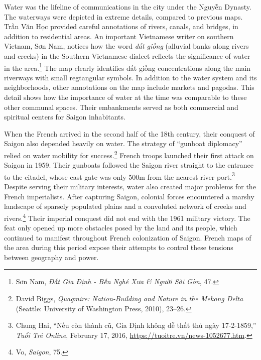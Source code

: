 Water was the lifeline of communications in the city under the Nguyễn Dynasty. The waterways were depicted in extreme details, compared to previous maps. Trần Văn Học provided careful annotations of rivers, canals, and bridges, in addition to residential areas. An important Vietnamese writer on southern Vietnam, Sơn Nam, notices how the word \textit{đất giồng} (alluvial banks along rivers and creeks) in the Southern Vietnamese dialect reflects the significance of water in the area.\footnote{Sơn Nam, \textit{Đất Gia Định - Bến Nghé Xưa \& Người Sài Gòn}, 47.} The map clearly identifies đất giồng concentrations along the main riverways with small regtangular symbols. In addition to the water system and its neighborhoods, other annotations on the map include markets and pagodas. This detail shows how the importance of water at the time was comparable to these other communal spaces. Their embankments served as both commercial and spiritual centers for Saigon inhabitants.

When the French arrived in the second half of the 18th century, their conquest of Saigon also depended heavily on water. The strategy of “gunboat diplomacy” relied on water mobility for success.\footnote{David Biggs, \textit{Quagmire: Nation-Building and Nature in the Mekong Delta} (Seattle: University of Washington Press, 2010), 23–26.} French troops launched their first attack on Saigon in 1959. Their gunboats followed the Saigon river straight to the entrance to the citadel, whose east gate was only 500m from the nearest river port.\footnote{Chung Hai, “Nếu còn thành cũ, Gia Định không dễ thất thủ ngày 17-2-1859,” \textit{Tuổi Trẻ Online}, February 17, 2016, \url{https://tuoitre.vn/news-1052677.htm}.} Despite serving their military interests, water also created major problems for the French imperialists. After capturing Saigon, colonial forces encountered a marshy landscape of sparsely populated plains and a convoluted network of creeks and rivers.\footnote{Vo, \textit{Saigon}, 75.} Their imperial conquest did not end with the 1961 military victory. The feat only opened up more obstacles posed by the land and its people, which continued to manifest throughout French colonization of Saigon. French maps of the area during this period expose their attempts to control these tensions between geography and power.

